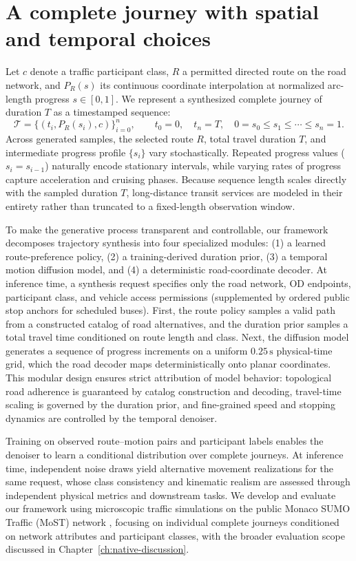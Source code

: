 \section{A complete journey with spatial and temporal choices}

Let $c$ denote a traffic participant class, $R$ a permitted directed route on the road network, and $P_R(s)$ its continuous coordinate interpolation at normalized arc-length progress $s\in[0,1]$. We represent a synthesized complete journey of duration $T$ as a timestamped sequence:
\begin{equation}
 \mathcal T=\{(t_i,P_R(s_i),c)\}_{i=0}^{n},\qquad
 t_0=0,\quad t_n=T,\quad
 0=s_0\leq s_1\leq\cdots\leq s_n=1.
 \label{eq:native-trip-definition}
\end{equation}
Across generated samples, the selected route $R$, total travel duration $T$, and intermediate progress profile $\{s_i\}$ vary stochastically. Repeated progress values ($s_i = s_{i-1}$) naturally encode stationary intervals, while varying rates of progress capture acceleration and cruising phases. Because sequence length scales directly with the sampled duration $T$, long-distance transit services are modeled in their entirety rather than truncated to a fixed-length observation window.

To make the generative process transparent and controllable, our framework decomposes trajectory synthesis into four specialized modules: (1) a learned route-preference policy, (2) a training-derived duration prior, (3) a temporal motion diffusion model, and (4) a deterministic road-coordinate decoder. At inference time, a synthesis request specifies only the road network, OD endpoints, participant class, and vehicle access permissions (supplemented by ordered public stop anchors for scheduled buses). First, the route policy samples a valid path from a constructed catalog of road alternatives, and the duration prior samples a total travel time conditioned on route length and class. Next, the diffusion model generates a sequence of progress increments on a uniform $0.25\,\text{s}$ physical-time grid, which the road decoder maps deterministically onto planar coordinates. This modular design ensures strict attribution of model behavior: topological road adherence is guaranteed by catalog construction and decoding, travel-time scaling is governed by the duration prior, and fine-grained speed and stopping dynamics are controlled by the temporal denoiser.

Training on observed route--motion pairs and participant labels enables the denoiser to learn a conditional distribution over complete journeys. At inference time, independent noise draws yield alternative movement realizations for the same request, whose class consistency and kinematic realism are assessed through independent physical metrics and downstream tasks. We develop and evaluate our framework using microscopic traffic simulations on the public Monaco SUMO Traffic (MoST) network \cite{most,sumodocs}, focusing on individual complete journeys conditioned on network attributes and participant classes, with the broader evaluation scope discussed in Chapter~\ref{ch:native-discussion}.

